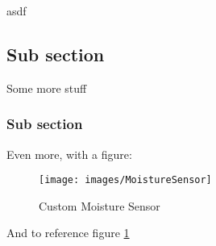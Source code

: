 asdf

\subsection{Sub section}

Some more stuff

\subsubsection{Sub section}

Even more, with a figure:

\begin{figure}[h]
    \centering
    \texttt{[image: images/MoistureSensor]}
    \caption{Custom Moisture Sensor}
    \label{fig:moistureSensor}
\end{figure}

And to reference figure \ref{fig:moistureSensor}